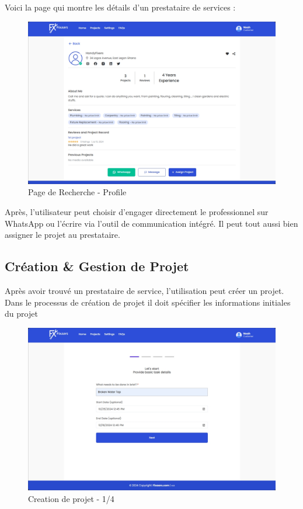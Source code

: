 {Voici la page qui montre les détails d'un prestataire de services :

\vspace{0.35cm}
\begin{figure}[H]
\begin{center}
\includegraphics[width=12cm]{assets/demo/search-profile.png}
\end{center}
\caption{Page de Recherche - Profile}
\end{figure}

Après, l'utilisateur peut choisir d'engager directement le professionnel sur WhatsApp ou l'écrire via l'outil de communication intégré. Il peut tout aussi bien assigner le projet au prestataire. 


\subsection{Création \& Gestion de Projet}

Après avoir trouvé un prestataire de service, l'utilisation peut créer un projet. Dans le processus de création de projet il doit spécifier les informations initiales du projet 


\vspace{0.35cm}
\begin{figure}[H]
\begin{center}
\includegraphics[width=12cm]{assets/demo/setup-1.png}
\end{center}
\caption{Creation de projet - 1/4}
\end{figure}

}
